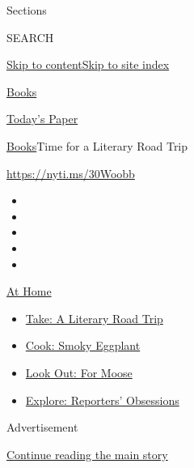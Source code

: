 Sections

SEARCH

\protect\hyperlink{site-content}{Skip to
content}\protect\hyperlink{site-index}{Skip to site index}

\href{https://www.nytimes.com/section/books}{Books}

\href{https://myaccount.nytimes.com/auth/login?response_type=cookie\&client_id=vi}{}

\href{https://www.nytimes.com/section/todayspaper}{Today's Paper}

\href{/section/books}{Books}\textbar{}Time for a Literary Road Trip

\url{https://nyti.ms/30Woobb}

\begin{itemize}
\item
\item
\item
\item
\item
\end{itemize}

\href{https://www.nytimes.com/spotlight/at-home?action=click\&pgtype=Article\&state=default\&region=TOP_BANNER\&context=at_home_menu}{At
Home}

\begin{itemize}
\tightlist
\item
  \href{https://www.nytimes.com/2020/07/28/books/time-for-a-literary-road-trip.html?action=click\&pgtype=Article\&state=default\&region=TOP_BANNER\&context=at_home_menu}{Take:
  A Literary Road Trip}
\item
  \href{https://www.nytimes.com/2020/07/29/magazine/bored-with-your-home-cooking-some-smoky-eggplant-will-fix-that.html?action=click\&pgtype=Article\&state=default\&region=TOP_BANNER\&context=at_home_menu}{Cook:
  Smoky Eggplant}
\item
  \href{https://www.nytimes.com/2020/07/27/travel/moose-michigan-isle-royale.html?action=click\&pgtype=Article\&state=default\&region=TOP_BANNER\&context=at_home_menu}{Look
  Out: For Moose}
\item
  \href{https://www.nytimes.com/interactive/2020/at-home/even-more-reporters-editors-diaries-lists-recommendations.html?action=click\&pgtype=Article\&state=default\&region=TOP_BANNER\&context=at_home_menu}{Explore:
  Reporters' Obsessions}
\end{itemize}

Advertisement

\protect\hyperlink{after-top}{Continue reading the main story}

